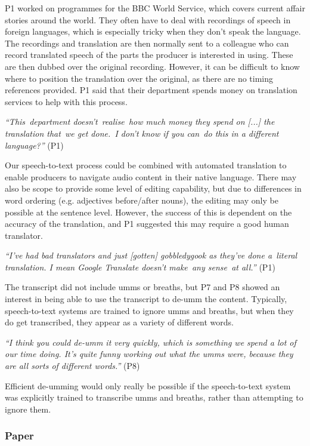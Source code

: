 P1 worked on programmes for the BBC World Service, which covers current affair stories around the world.  They often
have to deal with recordings of speech in foreign languages, which is especially tricky when they don't speak the
language.  The recordings and translation are then normally sent to a colleague who can record translated speech of the
parts the producer is interested in using. These are then dubbed over the original recording. However, it can be
difficult to know where to position the translation over the original, as there are no timing references provided.  P1
said that their department spends money on translation services to help with this process.

\textit{``This department doesn't realise how much money they spend on [...] the translation that we get done. I don't
know if you can do this in a different language?''} (P1)

Our speech-to-text process could be combined with automated translation to enable producers to navigate audio content
in their native language. There may also be scope to provide some level of editing capability, but due to differences
in word ordering (e.g. adjectives before/after nouns), the editing may only be possible at the sentence level. However,
the success of this is dependent on the accuracy of the translation, and P1 suggested this may require a good human
translator.

\textit{``I've had bad translators and just [gotten] gobbledygook as they've done a literal translation. I mean Google
Translate doesn't make any sense at all.''} (P1)


The transcript did not include umms or breaths, but P7 and P8 showed an interest in being able to use the transcript to
de-umm the content. Typically, speech-to-text systems are trained to ignore umms and breaths, but when they do get
transcribed, they appear as a variety of different words.

\textit{``I think you could de-umm it very quickly, which is something we spend a lot of our time doing.  It's quite
funny working out what the umms were, because they are all sorts of different words.''} (P8)

Efficient de-umming would only really be possible if the speech-to-text system was explicitly trained to transcribe
umms and breaths, rather than attempting to ignore them.

\subsubsection{Paper}

